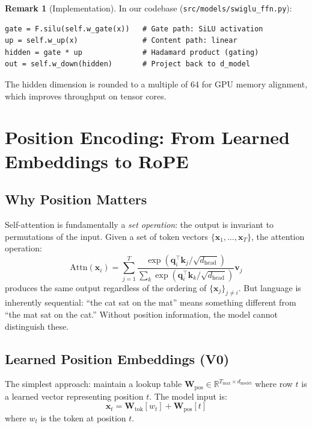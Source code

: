 \documentclass[11pt, a4paper]{article}
\theoremstyle{definition}
\newtheorem{remark}{Remark}[section]
\newcommand{\vx}{\bm{x}}
\newcommand{\vq}{\bm{q}}
\newcommand{\vk}{\bm{k}}
\newcommand{\vv}{\bm{v}}
\newcommand{\mW}{\bm{W}}
\newcommand{\reals}{\mathbb{R}}
\newcommand{\dmodel}{d_{\text{model}}}
\newcommand{\dhead}{d_{\text{head}}}
\begin{document}
\begin{remark}[Implementation]
In our codebase (\texttt{src/models/swiglu\_ffn.py}):
\begin{lstlisting}
gate = F.silu(self.w_gate(x))   # Gate path: SiLU activation
up = self.w_up(x)               # Content path: linear
hidden = gate * up              # Hadamard product (gating)
out = self.w_down(hidden)       # Project back to d_model
\end{lstlisting}
The hidden dimension is rounded to a multiple of 64 for GPU memory alignment, which improves throughput on tensor cores.
\end{remark}


\section{Position Encoding: From Learned Embeddings to RoPE}

\subsection{Why Position Matters}

Self-attention is fundamentally a \emph{set operation}: the output is invariant to permutations of the input. Given a set of token vectors $\{\vx_1, \ldots, \vx_T\}$, the attention operation:
\begin{equation}
    \mathrm{Attn}(\vx_i) = \sum_{j=1}^T \frac{\exp(\vq_i^\top \vk_j / \sqrt{\dhead})}{\sum_k \exp(\vq_i^\top \vk_k / \sqrt{\dhead})} \vv_j
\end{equation}
produces the same output regardless of the ordering of $\{\vx_j\}_{j \neq i}$. But language is inherently sequential: ``the cat sat on the mat'' means something different from ``the mat sat on the cat.'' Without position information, the model cannot distinguish these.

\subsection{Learned Position Embeddings (V0)}

The simplest approach: maintain a lookup table $\mW_{\text{pos}} \in \reals^{T_{\max} \times \dmodel}$ where row $t$ is a learned vector representing position $t$. The model input is:
\begin{equation}
    \vx_t = \mW_{\text{tok}}[w_t] + \mW_{\text{pos}}[t]
\end{equation}
where $w_t$ is the token at position $t$.
\end{document}
